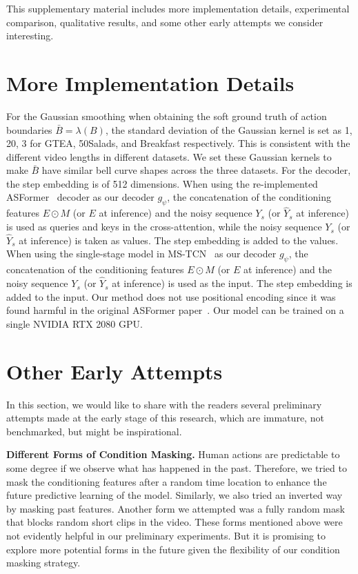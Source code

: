 \documentclass[10pt,twocolumn,letterpaper]{article}
\begin{document}
This supplementary material includes more implementation details, experimental comparison, qualitative results, and some other early attempts we consider interesting. 

\section{More Implementation Details}

For the Gaussian smoothing when obtaining the soft ground truth of action boundaries $\bar{B} = \lambda(B)$, the standard deviation of the Gaussian kernel is set as 1, 20, 3 for GTEA, 50Salads, and Breakfast respectively.
This is consistent with the different video lengths in different datasets.
We set these Gaussian kernels to make $\bar{B}$ have similar bell curve shapes across the three datasets.
For the decoder, the step embedding is of 512 dimensions.
When using the re-implemented ASFormer~\cite{2021_BMVC_Yi} decoder as our decoder $g_\psi$, the concatenation of the conditioning features $E \odot M$ (or $E$ at inference) and the noisy sequence $Y_s$ (or $\hat{Y}_{s}$ at inference) is used as queries and keys in the cross-attention, while the noisy sequence $Y_s$ (or $\hat{Y}_{s}$ at inference) is taken as values.
The step embedding is added to the values. 
When using the single-stage model in MS-TCN~\cite{2019_CVPR_Farha} as our decoder $g_\psi$, the concatenation of the conditioning features $E \odot M$ (or $E$ at inference) and the noisy sequence $Y_s$ (or $\hat{Y}_{s}$ at inference) is used as the input.
The step embedding is added to the input. 
Our method does not use positional encoding since it was found harmful in the original ASFormer paper~\cite{2021_BMVC_Yi}.
Our model can be trained on a single NVIDIA RTX 2080 GPU.

\section{Other Early Attempts}

In this section, we would like to share with the readers several preliminary attempts made at the early stage of this research, which are immature, not benchmarked, but might be inspirational.

\textbf{Different Forms of Condition Masking.}
Human actions are predictable to some degree if we observe what has happened in the past.
Therefore, we tried to mask the conditioning features after a random time location to enhance the future predictive learning of the model.
Similarly, we also tried an inverted way by masking past features.
Another form we attempted was a fully random mask that blocks random short clips in the video.
These forms mentioned above were not evidently helpful in our preliminary experiments.
But it is promising to explore more potential forms in the future given the flexibility of our condition masking strategy.
\end{document}
